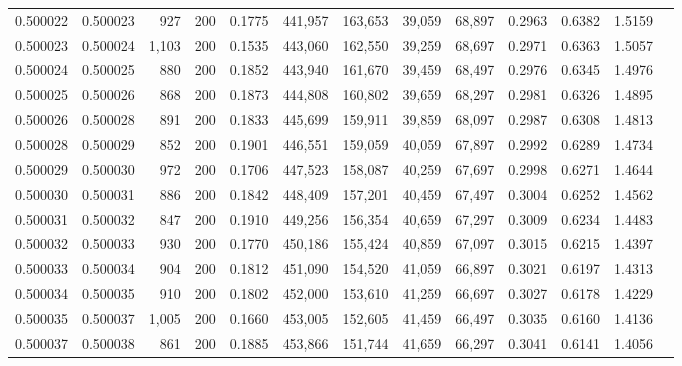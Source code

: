 \begin{tabular}{rrrrrrrrrrrrr}
0.500022 & 0.500023 &    927 & 200 &                                     0.1775 & 441,957 & 163,653 &  39,059 &  68,897 & 0.2963 & 0.6382 & 1.5159 \\
0.500023 & 0.500024 &  1,103 & 200 &                                     0.1535 & 443,060 & 162,550 &  39,259 &  68,697 & 0.2971 & 0.6363 & 1.5057 \\
0.500024 & 0.500025 &    880 & 200 &                                     0.1852 & 443,940 & 161,670 &  39,459 &  68,497 & 0.2976 & 0.6345 & 1.4976 \\
0.500025 & 0.500026 &    868 & 200 &                                     0.1873 & 444,808 & 160,802 &  39,659 &  68,297 & 0.2981 & 0.6326 & 1.4895 \\
0.500026 & 0.500028 &    891 & 200 &                                     0.1833 & 445,699 & 159,911 &  39,859 &  68,097 & 0.2987 & 0.6308 & 1.4813 \\
0.500028 & 0.500029 &    852 & 200 &                                     0.1901 & 446,551 & 159,059 &  40,059 &  67,897 & 0.2992 & 0.6289 & 1.4734 \\
0.500029 & 0.500030 &    972 & 200 &                                     0.1706 & 447,523 & 158,087 &  40,259 &  67,697 & 0.2998 & 0.6271 & 1.4644 \\
0.500030 & 0.500031 &    886 & 200 &                                     0.1842 & 448,409 & 157,201 &  40,459 &  67,497 & 0.3004 & 0.6252 & 1.4562 \\
0.500031 & 0.500032 &    847 & 200 &                                     0.1910 & 449,256 & 156,354 &  40,659 &  67,297 & 0.3009 & 0.6234 & 1.4483 \\
0.500032 & 0.500033 &    930 & 200 &                                     0.1770 & 450,186 & 155,424 &  40,859 &  67,097 & 0.3015 & 0.6215 & 1.4397 \\
0.500033 & 0.500034 &    904 & 200 &                                     0.1812 & 451,090 & 154,520 &  41,059 &  66,897 & 0.3021 & 0.6197 & 1.4313 \\
0.500034 & 0.500035 &    910 & 200 &                                     0.1802 & 452,000 & 153,610 &  41,259 &  66,697 & 0.3027 & 0.6178 & 1.4229 \\
0.500035 & 0.500037 &  1,005 & 200 &                                     0.1660 & 453,005 & 152,605 &  41,459 &  66,497 & 0.3035 & 0.6160 & 1.4136 \\
0.500037 & 0.500038 &    861 & 200 &                                     0.1885 & 453,866 & 151,744 &  41,659 &  66,297 & 0.3041 & 0.6141 & 1.4056 \\

\end{tabular}
